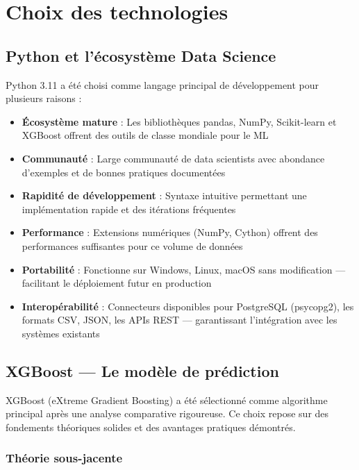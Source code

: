 \documentclass[a4paper,12pt]{report}
\begin{document}
\section{Choix des technologies}

\subsection{Python et l'écosystème Data Science}

Python 3.11 a été choisi comme langage principal de développement pour plusieurs raisons :

\begin{itemize}
    \item \textbf{Écosystème mature} : Les bibliothèques pandas, NumPy, Scikit-learn et XGBoost offrent des outils de classe mondiale pour le ML
    \item \textbf{Communauté} : Large communauté de data scientists avec abondance d'exemples et de bonnes pratiques documentées
    \item \textbf{Rapidité de développement} : Syntaxe intuitive permettant une implémentation rapide et des itérations fréquentes
    \item \textbf{Performance} : Extensions numériques (NumPy, Cython) offrent des performances suffisantes pour ce volume de données
    \item \textbf{Portabilité} : Fonctionne sur Windows, Linux, macOS sans modification — facilitant le déploiement futur en production
    \item \textbf{Interopérabilité} : Connecteurs disponibles pour PostgreSQL (psycopg2), les formats CSV, JSON, les APIs REST — garantissant l'intégration avec les systèmes existants
\end{itemize}

\subsection{XGBoost — Le modèle de prédiction}

XGBoost (eXtreme Gradient Boosting) a été sélectionné comme algorithme principal après une analyse comparative rigoureuse. Ce choix repose sur des fondements théoriques solides et des avantages pratiques démontrés.

\subsubsection{Théorie sous-jacente}
\end{document}
